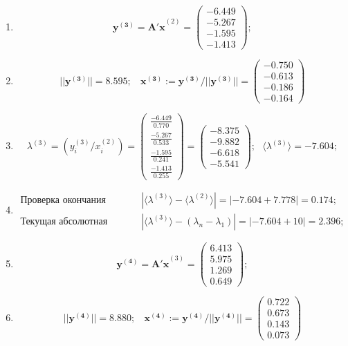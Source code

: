 \begin{enumerate}
\item $$
    \mathbf{y^{(3)} =A'x}^{(2)} = \begin{pmatrix}-6.449\\-5.267\\-1.595\\-1.413\end{pmatrix};$$

\item $$
    ||\mathbf{y^{(3)}}|| = 8.595; ~~~~
    \mathbf{x^{(3)}}:=\mathbf{y^{(3)}}/||\mathbf{y^{(3)}}|| =
    \begin{pmatrix} -0.750\\-0.613\\-0.186\\-0.164\end{pmatrix}$$

    \item $$
    \lambda^{(3)} =\left( y^{(3)}_i / x^{(2)}_i \right) =
    \begin{pmatrix} \frac{-6.449}{0.770}\\\frac{-5.267}{0.533}\\\frac{-1.595}{0.241}\\\frac{-1.413}{0.255}\end{pmatrix}=
    \begin{pmatrix} -8.375\\-9.882\\-6.618\\-5.541\end{pmatrix}; ~~~
    \langle\lambda^{(3)}\rangle = -7.604;$$

    \item $$
    \begin{matrix}
        \text{Проверка окончания алгоритма: }&|\langle\lambda^{(3)}\rangle - \langle\lambda^{(2)}\rangle| = |-7.604 + 7.778| =    \mathbf{0.174};\\
        \text{Текущая абсолютная ошибка: }&|\langle\lambda^{(3)}\rangle - (\lambda_n-\lambda_1)| = |-7.604 +10| = \mathbf{2.396};
    \end{matrix}$$




    \item $$
    \mathbf{y^{(4)} =A'x}^{(3)} = \begin{pmatrix}6.413\\5.975\\1.269\\0.649\end{pmatrix};$$

    \item $$
    ||\mathbf{y^{(4)}}|| = 8.880; ~~~~
    \mathbf{x^{(4)}}:=\mathbf{y^{(4)}}/||\mathbf{y^{(4)}}|| =
    \begin{pmatrix}0.722\\0.673\\0.143\\0.073\end{pmatrix}$$


\end{enumerate}
